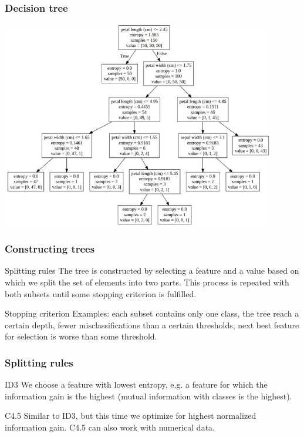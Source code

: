 \documentclass{beamer}
\begin{document}
\begin{frame}
\frametitle{Decision tree}
\includegraphics[width=0.9\textwidth]{bettertree.jpg}
\end{frame}


\begin{frame}
\frametitle{Constructing trees}

\begin{block}{Splitting rules}
The tree is constructed by selecting a feature and a value based on which we split the set of elements into two parts. This process is repeated with both subsets until some stopping criterion is fulfilled.
\end{block}

\begin{block}{Stopping criterion}
Examples: each subset contains only one class, the tree reach a certain depth, fewer misclassifications than a certain thresholds, next best feature for selection is worse than some threshold.
\end{block}
\end{frame}

\begin{frame}
\frametitle{Splitting rules}

\begin{block}{ID3}
We choose a feature with lowest entropy, e.g. a feature for which the information gain is the highest (mutual information with classes is the highest).
\end{block}

\begin{block}{C4.5}
Similar to ID3, but this time we optimize for highest normalized information gain. C4.5 can also work with numerical data.
\end{block}
\end{frame}
\end{document}
